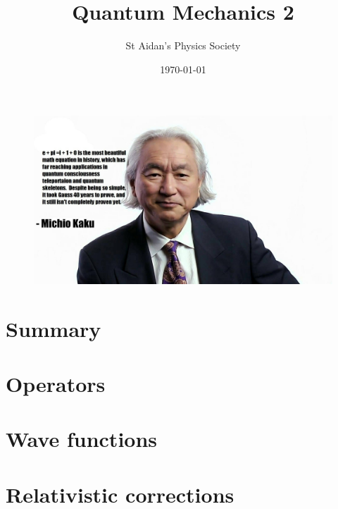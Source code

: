 \documentclass{physics_notes}
\title{Quantum Mechanics 2}
\author{St Aidan's Physics Society}
\date{\today}
\begin{document}
\maketitle
\begin{figure}[h!]
	\centering
	\includegraphics[width=\linewidth]{Figures/mich.png}
\end{figure}
\tableofcontents
\newpage

\section*{Summary}

\section{Operators}


\section{Wave functions}


\section{Relativistic corrections}

\end{document}
